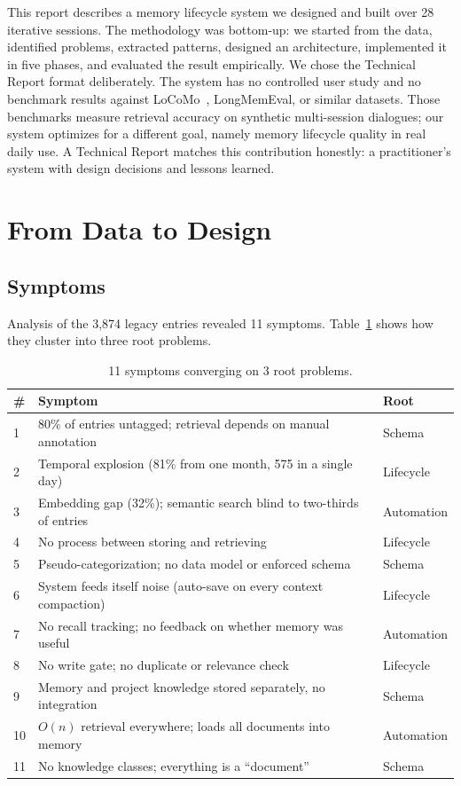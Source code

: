 \documentclass[11pt,a4paper]{article}
\begin{document}
This report describes a memory lifecycle system we designed and built over 28 iterative sessions.
The methodology was bottom-up: we started from the data, identified problems, extracted patterns, designed an architecture, implemented it in five phases, and evaluated the result empirically.
We chose the Technical Report format deliberately.
The system has no controlled user study and no benchmark results against LoCoMo~\cite{maharana2024locomo}, LongMemEval, or similar datasets.
Those benchmarks measure retrieval accuracy on synthetic multi-session dialogues; our system optimizes for a different goal, namely memory lifecycle quality in real daily use.
A Technical Report matches this contribution honestly: a practitioner's system with design decisions and lessons learned.


\section{From Data to Design}

\subsection{Symptoms}

Analysis of the 3,874 legacy entries revealed 11 symptoms.
Table~\ref{tab:symptoms} shows how they cluster into three root problems.

\begin{table}[h]
\centering
\caption{11 symptoms converging on 3 root problems.}
\label{tab:symptoms}
\small
\begin{tabularx}{\textwidth}{lXl}
\toprule
\textbf{\#} & \textbf{Symptom} & \textbf{Root} \\
\midrule
1 & 80\% of entries untagged; retrieval depends on manual annotation & Schema \\
2 & Temporal explosion (81\% from one month, 575 in a single day) & Lifecycle \\
3 & Embedding gap (32\%); semantic search blind to two-thirds of entries & Automation \\
4 & No process between storing and retrieving & Lifecycle \\
5 & Pseudo-categorization; no data model or enforced schema & Schema \\
6 & System feeds itself noise (auto-save on every context compaction) & Lifecycle \\
7 & No recall tracking; no feedback on whether memory was useful & Automation \\
8 & No write gate; no duplicate or relevance check & Lifecycle \\
9 & Memory and project knowledge stored separately, no integration & Schema \\
10 & $O(n)$ retrieval everywhere; loads all documents into memory & Automation \\
11 & No knowledge classes; everything is a ``document'' & Schema \\
\bottomrule
\end{tabularx}
\end{table}
\end{document}
